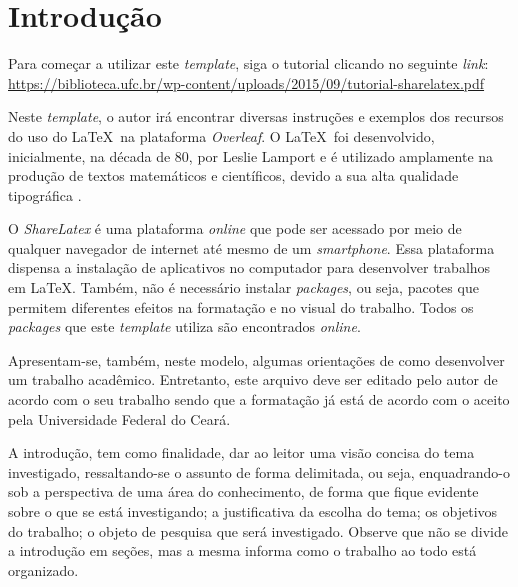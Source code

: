 \chapter{Introdução}
\label{cap:introducao}


Para começar a utilizar este \textit{template}, siga o tutorial
clicando no seguinte \textit{link}:
\url{https://biblioteca.ufc.br/wp-content/uploads/2015/09/tutorial-sharelatex.pdf}

Neste \textit{template}, o autor irá encontrar diversas instruções e
exemplos dos recursos do uso do \LaTeX~na plataforma
\textit{Overleaf}. O \LaTeX~foi desenvolvido, inicialmente, na década
de 80, por Leslie Lamport e é utilizado amplamente na produção de
textos matemáticos e científicos, devido a sua alta qualidade
tipográfica \cite{goossens1994latex}.

O \textit{ShareLatex} é uma plataforma \textit{online} que pode ser
acessado por meio de qualquer navegador de internet até mesmo de um
\textit{smartphone}. Essa plataforma dispensa a instalação de
aplicativos no computador para desenvolver trabalhos em
\LaTeX. Também, não é necessário instalar \textit{packages}, ou seja,
pacotes que permitem diferentes efeitos na formatação e no visual do
trabalho. Todos os \textit{packages} que este \textit{template}
utiliza são encontrados \textit{online}.

Apresentam-se, também, neste modelo, algumas orientações de como
desenvolver um trabalho acadêmico. Entretanto, este arquivo deve ser
editado pelo autor de acordo com o seu trabalho sendo que a formatação
já está de acordo com o aceito pela Universidade Federal do Ceará.

A introdução, tem como finalidade, dar ao leitor uma visão concisa do
tema investigado, ressaltando-se o assunto de forma delimitada, ou
seja, enquadrando-o sob a perspectiva de uma área do conhecimento, de
forma que fique evidente sobre o que se está investigando; a
justificativa da escolha do tema; os objetivos do trabalho; o objeto
de pesquisa que será investigado. Observe que não se divide a
introdução em seções, mas a mesma informa como o trabalho ao todo está
organizado.





